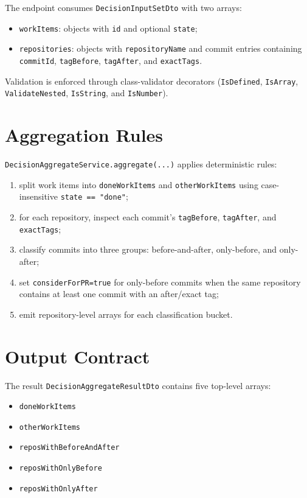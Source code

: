 \documentclass[12pt,a4paper]{report}
\newcommand{\code}[1]{\texttt{\small\color{codered}#1}}
\begin{document}
The endpoint consumes \code{DecisionInputSetDto} with two arrays:

\begin{itemize}
  \item \code{workItems}: objects with \code{id} and optional \code{state};
  \item \code{repositories}: objects with \code{repositoryName} and commit entries containing \code{commitId}, \code{tagBefore}, \code{tagAfter}, and \code{exactTags}.
\end{itemize}

\noindent Validation is enforced through class-validator decorators
(\code{IsDefined}, \code{IsArray}, \code{ValidateNested}, \code{IsString}, and \code{IsNumber}).

\section{Aggregation Rules}

\code{DecisionAggregateService.aggregate(...)} applies deterministic rules:

\begin{enumerate}
  \item split work items into \code{doneWorkItems} and \code{otherWorkItems} using case-insensitive \code{state == "done"};
  \item for each repository, inspect each commit's \code{tagBefore}, \code{tagAfter}, and \code{exactTags};
  \item classify commits into three groups: before-and-after, only-before, and only-after;
  \item set \code{considerForPR=true} for only-before commits when the same repository contains at least one commit with an after/exact tag;
  \item emit repository-level arrays for each classification bucket.
\end{enumerate}

\section{Output Contract}

The result \code{DecisionAggregateResultDto} contains five top-level arrays:

\begin{itemize}
  \item \code{doneWorkItems}
  \item \code{otherWorkItems}
  \item \code{reposWithBeforeAndAfter}
  \item \code{reposWithOnlyBefore}
  \item \code{reposWithOnlyAfter}
\end{itemize}
\end{document}
